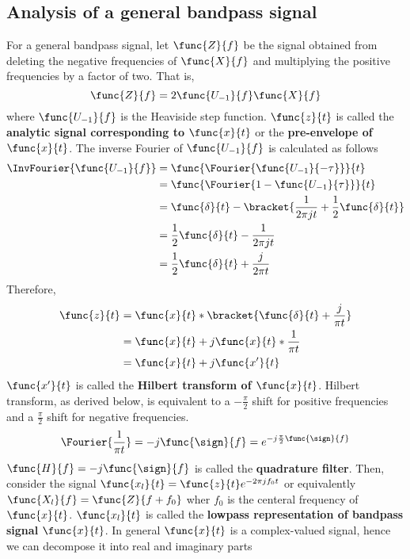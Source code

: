 \subsection{Analysis of a general bandpass signal}
For a general bandpass signal, let \(\func{Z}{f}\) be the signal obtained from deleting the negative frequencies of \(\func{X}{f}\) and multiplying the positive frequencies by a factor of two. That is, 
\begin{equation*}
    \func{Z}{f} = 2 \func{U_{-1}}{f} \func{X}{f}
\end{equation*}
where \(\func{U_{-1}}{f}\) is the Heaviside step function. \(\func{z}{t}\) is called the \textbf{analytic signal corresponding to \(\func{x}{t}\)} or the  \textbf{pre-envelope of \(\func{x}{t}\)}.
 The inverse Fourier of \(\func{U_{-1}}{f}\) is calculated as follows 
\begin{align*}
    \InvFourier{\func{U_{-1}}{f}} &= \func{\Fourier{\func{U_{-1}}{-\tau}}}{t}\\
    &= \func{\Fourier{1 - \func{U_{-1}}{\tau}}}{t}\\
    &= \func{\delta}{t} - \bracket{\dfrac{1}{2\pi j t} + \dfrac{1}{2}  \func{\delta}{t}}\\
    &= \dfrac{1}{2} \func{\delta}{t} - \dfrac{1}{2\pi j t}\\
    &= \dfrac{1}{2} \func{\delta}{t} + \dfrac{j}{2\pi t}
\end{align*}
Therefore, 
\begin{align*}
    \func{z}{t} &= \func{x}{t} \ast \bracket{ \func{\delta}{t} + \dfrac{j}{\pi t}}\\
    &= \func{x}{t} + j \func{x}{t} \ast \dfrac{1}{\pi t}\\
    &= \func{x}{t} + j \func{x'}{t}
\end{align*}
\(\func{x'}{t}\) is called the \textbf{Hilbert transform of \(\func{x}{t}\)}. Hilbert transform, as derived below, is equivalent to a \(- \frac{\pi}{2}\) shift for positive frequencies and a \(\frac{\pi}{2}\) shift for negative frequencies. 
\begin{equation*}
    \Fourier{\dfrac{1}{\pi t}} = -j \func{\sign}{f} = e^{-j \frac{\pi}{2} \func{\sign}{f}}
\end{equation*}
\(\func{H}{f} = -j \func{\sign}{f}\) is called the \textbf{quadrature filter}. Then, consider the signal \(\func{x_l}{t} = \func{z}{t} e^{-2\pi j f_0 t}\) or equivalently \(\func{X_l}{f} = \func{Z}{f + f_0}\) wher \(f_0\) is the centeral frequency of \(\func{x}{t}\). \(\func{x_l}{t}\) is called the \textbf{lowpass representation of bandpass signal \(\func{x}{t}\)}. In general \(\func{x}{t}\) is a complex-valued signal, hence we can decompose it into real and imaginary parts 
